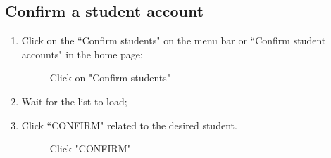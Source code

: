 \documentclass[ManualeUtente]{subfiles}
\begin{document}
\subsection{Confirm a student account}
\begin{enumerate}
	\item Click on the \textquotedblleft Confirm students" on the menu bar or \textquotedblleft Confirm student accounts" in the home page;
	\begin{figure}[H]
		\centering
		\caption{Click on "Confirm students"}
		\label{fig:Click on "Confirm students"}
	\end{figure}
	\item Wait for the list to load;
	\item Click \textquotedblleft CONFIRM" related to the desired student.
	\begin{figure}[H]
		\centering
		\caption{Click "CONFIRM"}
		\label{fig:Click "CONFIRM"}
	\end{figure}
\end{enumerate}
\end{document}
